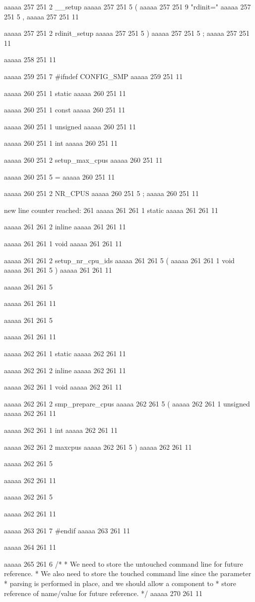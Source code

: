 aaaaa 257 251
2
__setup
aaaaa 257 251
5
(
aaaaa 257 251
9
"rdinit="
aaaaa 257 251
5
,
aaaaa 257 251
11
 
aaaaa 257 251
2
rdinit_setup
aaaaa 257 251
5
)
aaaaa 257 251
5
;
aaaaa 257 251
11


aaaaa 258 251
11


aaaaa 259 251
7
#ifndef CONFIG_SMP
aaaaa 259 251
11


aaaaa 260 251
1
static
aaaaa 260 251
11
 
aaaaa 260 251
1
const
aaaaa 260 251
11
 
aaaaa 260 251
1
unsigned
aaaaa 260 251
11
 
aaaaa 260 251
1
int
aaaaa 260 251
11
 
aaaaa 260 251
2
setup_max_cpus
aaaaa 260 251
11
 
aaaaa 260 251
5
=
aaaaa 260 251
11
 
aaaaa 260 251
2
NR_CPUS
aaaaa 260 251
5
;
aaaaa 260 251
11


new line counter reached: 261
aaaaa 261 261
1
static
aaaaa 261 261
11
 
aaaaa 261 261
2
inline
aaaaa 261 261
11
 
aaaaa 261 261
1
void
aaaaa 261 261
11
 
aaaaa 261 261
2
setup_nr_cpu_ids
aaaaa 261 261
5
(
aaaaa 261 261
1
void
aaaaa 261 261
5
)
aaaaa 261 261
11
 
aaaaa 261 261
5
{
aaaaa 261 261
11
 
aaaaa 261 261
5
}
aaaaa 261 261
11


aaaaa 262 261
1
static
aaaaa 262 261
11
 
aaaaa 262 261
2
inline
aaaaa 262 261
11
 
aaaaa 262 261
1
void
aaaaa 262 261
11
 
aaaaa 262 261
2
smp_prepare_cpus
aaaaa 262 261
5
(
aaaaa 262 261
1
unsigned
aaaaa 262 261
11
 
aaaaa 262 261
1
int
aaaaa 262 261
11
 
aaaaa 262 261
2
maxcpus
aaaaa 262 261
5
)
aaaaa 262 261
11
 
aaaaa 262 261
5
{
aaaaa 262 261
11
 
aaaaa 262 261
5
}
aaaaa 262 261
11


aaaaa 263 261
7
#endif
aaaaa 263 261
11


aaaaa 264 261
11


aaaaa 265 261
6
/*
 * We need to store the untouched command line for future reference.
 * We also need to store the touched command line since the parameter
 * parsing is performed in place, and we should allow a component to
 * store reference of name/value for future reference.
 */
aaaaa 270 261
11


